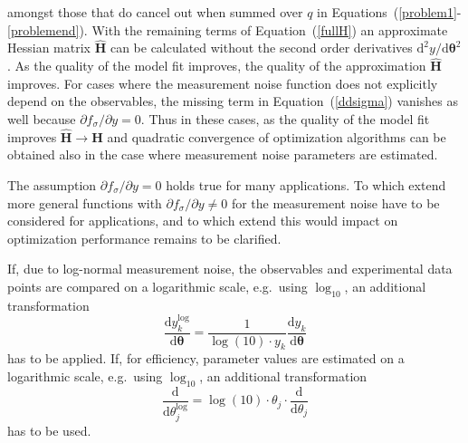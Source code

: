 \documentclass[12pt,a4paper]{scrartcl}
\newcommand{\DD}[2]{\frac{\mathrm{d} #1}{\mathrm{d} #2}}
\begin{document}
amongst those that do cancel out when summed over $q$ in Equations~(\ref{problem1}-
\ref{problemend}). With the remaining terms of Equation~(\ref{fullH}) an approximate 
Hessian matrix $\mathbf{\hat H}$ can be calculated without the second order derivatives 
$\mathrm{d}^2 {y}/\mathrm{d} \boldsymbol{\theta}^2$. As the quality of the model fit improves, the quality of 
the approximation $\mathbf{\hat H}$ improves. For cases where the measurement noise 
function does not explicitly depend on the observables, the missing term in 
Equation~(\ref{ddsigma}) vanishes as well because $\partial f_\sigma / \partial y= 0$. Thus 
in these cases, as the quality of the model fit improves $\mathbf{\hat H} \rightarrow 
\mathbf{H}$ and quadratic convergence of optimization algorithms can be obtained also in 
the case where measurement noise parameters are estimated. 

The assumption $\partial f_\sigma / \partial y = 0$ holds true for many applications. To 
which extend more general functions with $\partial f_\sigma / \partial y \not= 0$ for the 
measurement noise have to be considered for applications, and to which extend this 
would impact on optimization performance remains to be clarified.

If, due to log-normal measurement noise, the observables and experimental data points 
are compared on a logarithmic scale, e.g.~using $\log_{10}$, an additional transformation
\begin{equation}
	\DD{y_k^{\log}}{\boldsymbol{\theta}} =  \frac{1}{\log(10) \cdot y_k}\DD{y_k}
{\boldsymbol{\theta}}
\end{equation}
has to be applied. 
If, for efficiency, parameter values are estimated on a logarithmic scale, e.g.~using $\log_{10}$, 
an additional transformation
\begin{equation}
	\DD{}{\theta_j^{\log}} = \log(10)\cdot \theta_j \cdot \DD{}{\theta_j}
\end{equation}
has to be used. 
\end{document}
